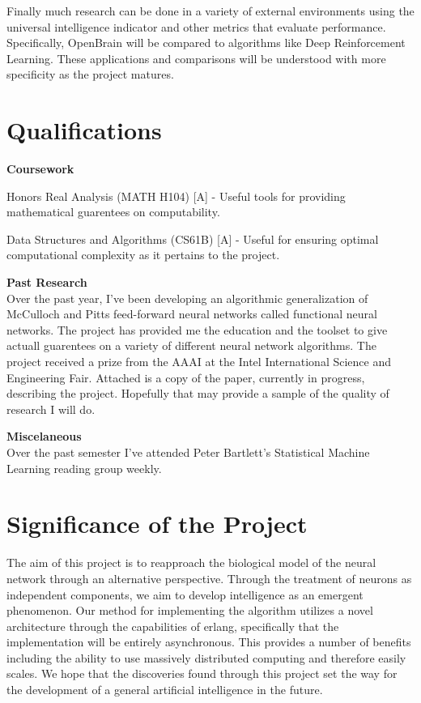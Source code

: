 \documentclass[letter]{article}
\newenvironment{menumerate}{%
  \edef\backupindent{\the\parindent}%
  \enumerate%
  \setlength{\parindent}{\backupindent}%
}{\endenumerate}
\begin{document}
Finally much research can be done in a variety of external environments using the universal intelligence indicator
and other metrics that evaluate performance. Specifically, OpenBrain will be compared to algorithms like Deep Reinforcement Learning.
These applications and comparisons will be understood with more specificity as the project matures.

\section{Qualifications}
\textbf{Coursework}
\begin{menumerate}
\item Honors Real Analysis (MATH H104) [A] - Useful tools for providing mathematical guarentees on computability.
\item Data Structures and Algorithms (CS61B) [A] - Useful for ensuring optimal computational complexity as it pertains to the project.
\end{menumerate}


\textbf{Past Research} \\
Over the past year, I've been developing an algorithmic generalization of McCulloch and Pitts feed-forward neural networks
called functional neural networks. The project has provided me the education and the toolset to give actuall guarentees on
a variety of different neural network algorithms. The project received a prize from the AAAI at the Intel International Science and Engineering Fair.
Attached is a copy of the paper, currently in progress, describing the project. Hopefully that may provide a sample of the quality
of research I will do.

\textbf{Miscelaneous} \\
Over the past semester I've attended Peter Bartlett's Statistical Machine Learning reading group weekly.

\section{Significance of the Project}
The aim of this project is to reapproach the biological model of the neural network through an alternative perspective. Through the treatment of
neurons as independent components, we aim to develop intelligence as an emergent phenomenon. Our method for implementing the algorithm utilizes
a novel architecture through the capabilities of erlang, specifically that the implementation will be entirely asynchronous. This provides
a number of benefits including the ability to use massively distributed computing and therefore easily scales. We hope that the discoveries found
through this project set the way for the development of a general artificial intelligence in the future.
\end{document}
